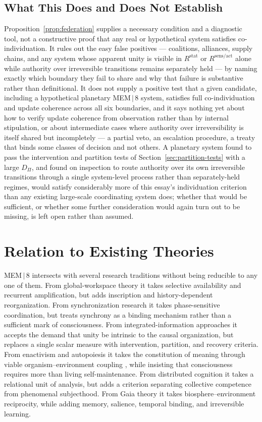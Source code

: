 \documentclass[11pt]{article}
\begin{document}
\subsection{What This Does and Does Not Establish}

Proposition~\ref{prop:federation} supplies a necessary condition and a diagnostic tool, not a constructive proof that any real or hypothetical system satisfies co-individuation. It rules out the easy false positives --- coalitions, alliances, supply chains, and any system whose apparent unity is visible in $R^{\mathrm{stat}}$ or $R^{\mathrm{sens/act}}$ alone while authority over irreversible transitions remains separately held --- by naming exactly which boundary they fail to share and why that failure is substantive rather than definitional. It does not supply a positive test that a given candidate, including a hypothetical planetary MEM\,$|$\,8 system, satisfies full co-individuation and update coherence across all six boundaries, and it says nothing yet about how to verify update coherence from observation rather than by internal stipulation, or about intermediate cases where authority over irreversibility is itself shared but incompletely --- a partial veto, an escalation procedure, a treaty that binds some classes of decision and not others. A planetary system found to pass the intervention and partition tests of Section~\ref{sec:partition-tests} with a large $D_\Pi$, and found on inspection to route authority over its own irreversible transitions through a single system-level process rather than separately-held regimes, would satisfy considerably more of this essay's individuation criterion than any existing large-scale coordinating system does; whether that would be sufficient, or whether some further consideration would again turn out to be missing, is left open rather than assumed.

\section{Relation to Existing Theories}

MEM\,$|$\,8 intersects with several research traditions without being reducible to any one of them. From global-workspace theory it takes selective availability and recurrent amplification, but adds inscription and history-dependent reorganization. From synchronization research it takes phase-sensitive coordination, but treats synchrony as a binding mechanism rather than a sufficient mark of consciousness. From integrated-information approaches it accepts the demand that unity be intrinsic to the causal organization, but replaces a single scalar measure with intervention, partition, and recovery criteria. From enactivism and autopoiesis it takes the constitution of meaning through viable organism--environment coupling \cite{thompson2004}, while insisting that consciousness requires more than living self-maintenance. From distributed cognition it takes a relational unit of analysis, but adds a criterion separating collective competence from phenomenal subjecthood. From Gaia theory it takes biosphere--environment reciprocity, while adding memory, salience, temporal binding, and irreversible learning.
\end{document}
